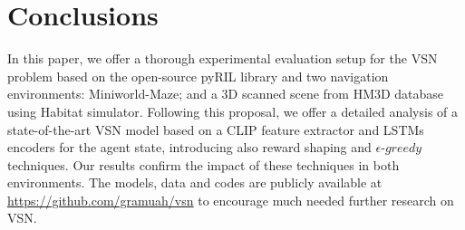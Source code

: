 \section{Conclusions}
\label{sec:conclusions}

In this paper, we offer a thorough experimental evaluation setup for the VSN problem based on the open-source pyRIL library and two navigation environments: Miniworld-Maze; and a 3D scanned scene from HM3D database using Habitat simulator.
Following this proposal, we offer a detailed analysis of a state-of-the-art VSN model based on a CLIP feature extractor and LSTMs encoders for the agent state, introducing also reward shaping and $\epsilon\text{-}greedy$ techniques.
Our results confirm the impact of these techniques in both environments. 
The models, data and codes are publicly available at \url{https://github.com/gramuah/vsn} to encourage much needed further research on VSN\@.
